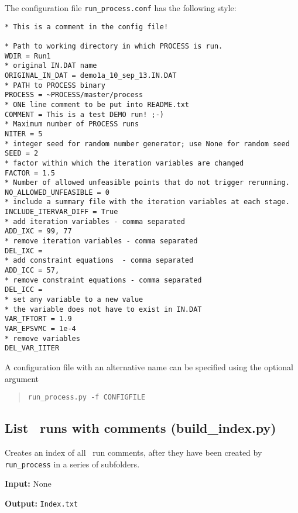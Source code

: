 The configuration file \texttt{run\_process.conf} has the following style:
\begin{framed}
\begin{verbatim}
* This is a comment in the config file!

* Path to working directory in which PROCESS is run.
WDIR = Run1
* original IN.DAT name 
ORIGINAL_IN_DAT = demo1a_10_sep_13.IN.DAT
* PATH to PROCESS binary
PROCESS = ~PROCESS/master/process
* ONE line comment to be put into README.txt
COMMENT = This is a test DEMO run! ;-)
* Maximum number of PROCESS runs
NITER = 5
* integer seed for random number generator; use None for random seed
SEED = 2
* factor within which the iteration variables are changed
FACTOR = 1.5
* Number of allowed unfeasible points that do not trigger rerunning.
NO_ALLOWED_UNFEASIBLE = 0 
* include a summary file with the iteration variables at each stage.
INCLUDE_ITERVAR_DIFF = True
* add iteration variables - comma separated
ADD_IXC = 99, 77
* remove iteration variables - comma separated
DEL_IXC = 
* add constraint equations  - comma separated 
ADD_ICC = 57,
* remove constraint equations - comma separated
DEL_ICC =
* set any variable to a new value
* the variable does not have to exist in IN.DAT
VAR_TFTORT = 1.9
VAR_EPSVMC = 1e-4
* remove variables
DEL_VAR_IITER
\end{verbatim}
\end{framed}
A configuration file with an alternative name can be specified using the optional argument
\begin{quote}
\begin{verbatim}
run_process.py -f CONFIGFILE
\end{verbatim}
\end{quote}

\subsection{List \process\ runs with comments (build\_index.py)}

Creates an index of all \process\ run comments, after they have been created by \texttt{run\_process} in a series of subfolders.

\begin{description}
\item{\textbf{Input:}}
None
                                
\item{\textbf{Output:}}
\verb|Index.txt|
\end{description}

